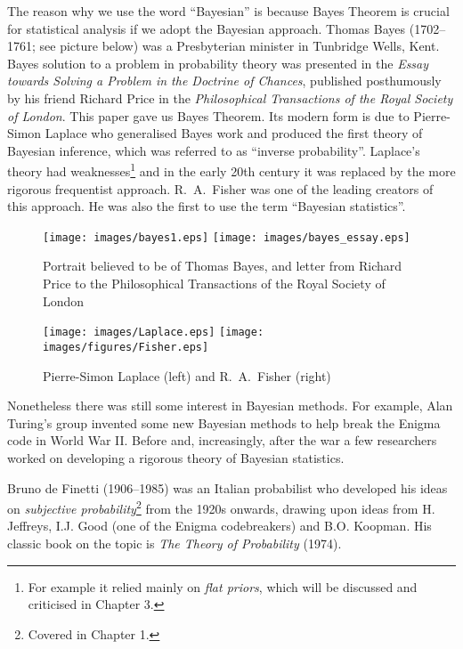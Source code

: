 The reason why we use the word ``Bayesian'' is because Bayes Theorem is crucial for statistical analysis if we adopt the Bayesian approach.
Thomas Bayes (1702--1761; see picture below) was a Presbyterian minister in Tunbridge Wells, Kent.
Bayes solution to a problem in probability theory was presented in the \textit{Essay towards Solving a Problem in the Doctrine of Chances}, published posthumously by his friend Richard
Price in the \textit{Philosophical Transactions of the Royal Society of London}.
This paper gave us Bayes Theorem.
Its modern form is due to Pierre-Simon Laplace who generalised Bayes work and produced the first theory of Bayesian inference, which was referred to as ``inverse probability''.  Laplace's theory had weaknesses\footnote{For example it relied mainly on \emph{flat priors}, which will be discussed and criticised in Chapter 3.} and in the early 20th century it was replaced by the more rigorous frequentist approach.  R.~A.~Fisher was one of the leading creators of this approach.
He was also the first to use the term ``Bayesian statistics''.
\begin{figure}

\texttt{[image: images/bayes1.eps]} \hspace{0.25cm} \texttt{[image: images/bayes\_essay.eps]}

\caption{Portrait believed to be of Thomas Bayes, and letter from Richard Price to the Philosophical Transactions of the Royal Society of London}
\end{figure}


\begin{figure}[ht]

\texttt{[image: images/Laplace.eps]} \texttt{[image: images/figures/Fisher.eps]}

\caption{Pierre-Simon Laplace (left) and R.~A.~Fisher (right)}
\end{figure}

Nonetheless there was still some interest in Bayesian methods.
For example, Alan Turing's group invented some new Bayesian methods to help break the Enigma code in World War II.
Before and, increasingly, after the war a few researchers worked on developing a rigorous theory of Bayesian statistics.

Bruno de Finetti (1906--1985) was an Italian probabilist who developed his ideas on \emph{subjective probability}\footnote{Covered in Chapter 1.} from the 1920s onwards, drawing upon ideas from H. Jeffreys, I.J. Good (one of the Enigma codebreakers) and B.O. Koopman.
His classic book on the topic is \textit{The Theory of Probability} (1974).


